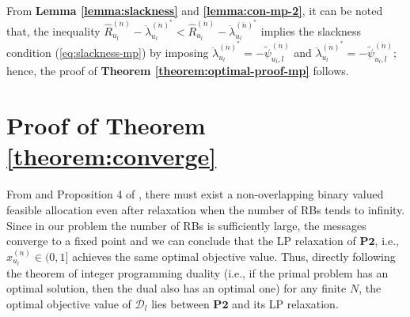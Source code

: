 \documentclass[twocolumn,10pt]{IEEEtran}
\begin{document}
From  \textbf{Lemma \ref{lemma:slackness}} and \textbf{\ref{lemma:con-mp-2}}, it can be noted that, the inequality $\widehat{R}_{u_l}^{(\dot{n})} - \ddot{\lambda}_{u_l}^{{(\dot{n})}^*} < \widehat{R}_{u_l}^{(\ddot{n})} - \ddot{\lambda}_{u_l}^{{(\ddot{n})}^*}$ implies the slackness condition (\ref{eq:slackness-mp}) by imposing $\ddot{\lambda}_{u_l}^{{(\dot{n})}^*} = - \tilde{\psi}_{u_l,l}^{(\dot{n})}$ and $\ddot{\lambda}_{u_l}^{{(\ddot{n})}^*} = - \tilde{\psi}_{u_l,l}^{(\ddot{n})}$; hence, the proof of \textbf{Theorem \ref{theorem:optimal-proof-mp}} follows.


\section{Proof of Theorem \ref{theorem:converge}} 
\label{app:converge-mp}


From \cite{large-rb-dual} and Proposition 4 of \cite{mp-convergence-proof},  there must exist a non-overlapping binary valued feasible allocation even after relaxation when the number of RBs tends to infinity. Since in our problem the number of RBs is sufficiently large, the messages converge to a fixed point and we can conclude that the LP relaxation of $\mathbf{P2}$, i.e., $x_{u_l}^{(n)} \in (0,1]$ achieves the same optimal objective value. Thus, directly following the theorem of integer programming duality (i.e., if the primal problem has an optimal solution, then the dual also has an optimal one) for any finite $N$, the optimal objective value of $\mathscr{D}_l$ lies between $\mathbf{P2}$ and its LP relaxation.







\end{document}
